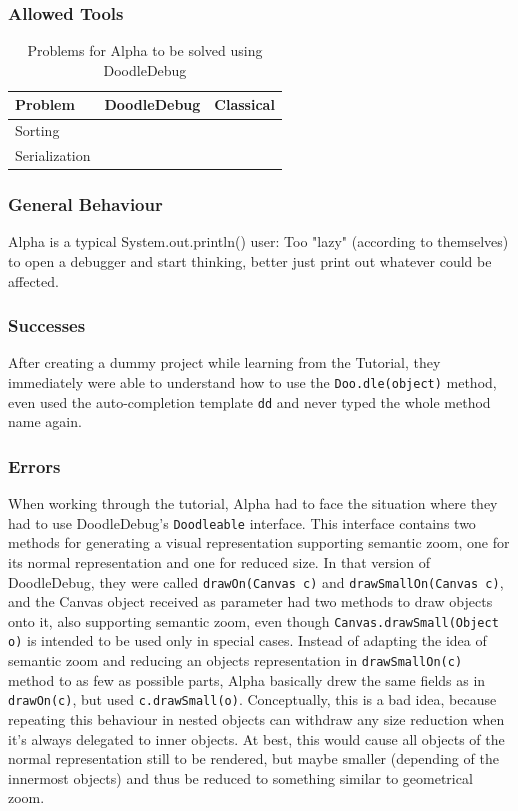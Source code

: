 \documentclass[a4paper,ngerman,english]{amsbook} %
\newcommand{\tick}{\ding{51}}
\begin{document}
\subsubsection*{Allowed Tools}
\begin{table}[h]
\centering
\begin{tabular}{l c c}
{\bf Problem} & {\bf DoodleDebug} & {\bf Classical} \\ \hline
Sorting & \tick &  \\
Serialization &  & \tick \\
\end{tabular}
\caption{Problems for Alpha to be solved using DoodleDebug}
\end{table}
\subsubsection*{General Behaviour}
Alpha is a typical System.out.println() user: Too "lazy" (according to themselves) to open a debugger and start thinking, better just print out whatever could be affected.
\subsubsection*{Successes}
After creating a dummy project while learning from the Tutorial, they immediately were able to understand how to use the \verb-Doo.dle(object)- method, even used the auto-completion template \verb.dd. and never typed the whole method name again.
\subsubsection*{Errors}
When working through the tutorial, Alpha had to face the situation where they had to use DoodleDebug's \verb.Doodleable. interface. This interface contains two methods for generating a visual representation supporting semantic zoom, one for its normal representation and one for reduced size. In that version of DoodleDebug, they were called \verb.drawOn(Canvas c). and \verb.drawSmallOn(Canvas c)., and the Canvas object received as parameter had two methods to draw objects onto it, also supporting semantic zoom, even though \verb-Canvas.drawSmall(Object o)- is intended to be used only in special cases. Instead of adapting the idea of semantic zoom and reducing an objects representation in \verb.drawSmallOn(c). method to as few as possible parts, Alpha basically drew the same fields as in \verb.drawOn(c)., but used \verb-c.drawSmall(o)-. Conceptually, this is a bad idea, because repeating this behaviour in nested objects can withdraw any size reduction when it's always delegated to inner objects. At best, this would cause all objects of the normal representation still to be rendered, but maybe smaller (depending of the innermost objects) and thus be reduced to something similar to geometrical zoom.
\end{document}
